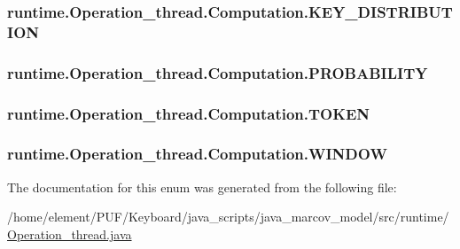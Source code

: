 \subsubsection[{\texorpdfstring{K\+E\+Y\+\_\+\+D\+I\+S\+T\+R\+I\+B\+U\+T\+I\+ON}{KEY_DISTRIBUTION}}]{\setlength{\rightskip}{0pt plus 5cm}runtime.\+Operation\+\_\+thread.\+Computation.\+K\+E\+Y\+\_\+\+D\+I\+S\+T\+R\+I\+B\+U\+T\+I\+ON}\hypertarget{enumruntime_1_1_operation__thread_1_1_computation_a8235775e9276cd32feb00cd4ca2e0a35}{}\label{enumruntime_1_1_operation__thread_1_1_computation_a8235775e9276cd32feb00cd4ca2e0a35}
\subsubsection[{\texorpdfstring{P\+R\+O\+B\+A\+B\+I\+L\+I\+TY}{PROBABILITY}}]{\setlength{\rightskip}{0pt plus 5cm}runtime.\+Operation\+\_\+thread.\+Computation.\+P\+R\+O\+B\+A\+B\+I\+L\+I\+TY}\hypertarget{enumruntime_1_1_operation__thread_1_1_computation_abe18ce6bfa0196cd62df7cb6fb7a9427}{}\label{enumruntime_1_1_operation__thread_1_1_computation_abe18ce6bfa0196cd62df7cb6fb7a9427}
\subsubsection[{\texorpdfstring{T\+O\+K\+EN}{TOKEN}}]{\setlength{\rightskip}{0pt plus 5cm}runtime.\+Operation\+\_\+thread.\+Computation.\+T\+O\+K\+EN}\hypertarget{enumruntime_1_1_operation__thread_1_1_computation_a67a1e69588a63abbde225f5a249623c5}{}\label{enumruntime_1_1_operation__thread_1_1_computation_a67a1e69588a63abbde225f5a249623c5}
\subsubsection[{\texorpdfstring{W\+I\+N\+D\+OW}{WINDOW}}]{\setlength{\rightskip}{0pt plus 5cm}runtime.\+Operation\+\_\+thread.\+Computation.\+W\+I\+N\+D\+OW}\hypertarget{enumruntime_1_1_operation__thread_1_1_computation_aa6eb3addd3d9b5c6002a65ad02b48558}{}\label{enumruntime_1_1_operation__thread_1_1_computation_aa6eb3addd3d9b5c6002a65ad02b48558}


The documentation for this enum was generated from the following file\+:\begin{DoxyCompactItemize}
\item 
/home/element/\+P\+U\+F/\+Keyboard/java\+\_\+scripts/java\+\_\+marcov\+\_\+model/src/runtime/\hyperlink{_operation__thread_8java}{Operation\+\_\+thread.\+java}\end{DoxyCompactItemize}
